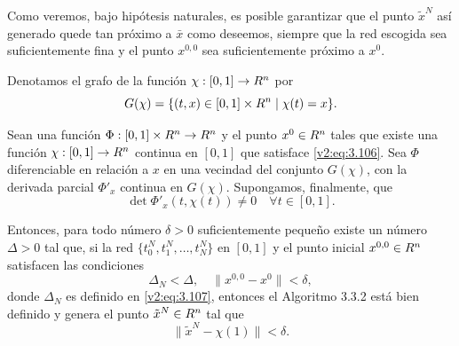 Como veremos, bajo hipótesis naturales, es posible garantizar que el punto $\tilde{x}^N$ así generado quede tan próximo a $\bar{x}$ como deseemos, siempre que la red escogida sea suficientemente fina y el punto $x^{0,0}$ sea suficientemente próximo a $x^0$.

Denotamos el grafo de la función $\chi : [0, 1] \to R^n$ por
\[
    G(\chi) = \{(t, x) \in [0, 1] \times R^n \mid \chi(t) = x\}.
\]

\begin{theorem}\label{v2:thm:3.3.3}
    Sean una función $\Phi : [0, 1] \times R^n \to R^n$ y el punto $x^0 \in R^n$ tales que existe una función $\chi : [0, 1] \to R^n$ continua en $[0, 1]$ que satisface \eqref{v2:eq:3.106}. Sea $\Phi$ diferenciable en relación a $x$ en una vecindad del conjunto $G(\chi)$, con la derivada parcial $\Phi'_x$ continua en $G(\chi)$. Supongamos, finalmente, que
    \begin{equation}
        \det \Phi'_x(t, \chi(t)) \neq 0 \quad \forall t \in [0, 1].
        \label{v2:eq:3.112}
    \end{equation}
    
    Entonces, para todo número $\delta > 0$ suficientemente pequeño existe un número $\Delta > 0$ tal que, si la red $\{t_0^N, t_1^N, \dots, t_N^N\}$ en $[0, 1]$ y el punto inicial $x^{0,0} \in R^n$ satisfacen las condiciones
    \begin{equation}
        \Delta_N < \Delta, \quad \|x^{0,0} - x^0\| < \delta,
        \label{v2:eq:3.113}
    \end{equation}
    donde $\Delta_N$ es definido en \eqref{v2:eq:3.107}, entonces el Algoritmo 3.3.2 está bien definido y genera el punto $\tilde{x}^N \in R^n$ tal que
    \begin{equation}
        \|\tilde{x}^N - \chi(1)\| < \delta.
        \label{v2:eq:3.114}
    \end{equation}
\end{theorem}

